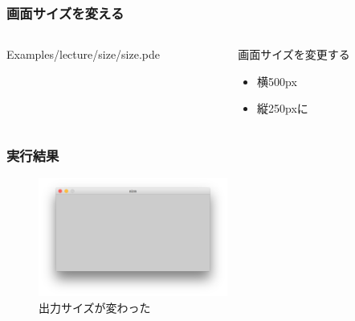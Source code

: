 \documentclass[10pt, dvipdfmx]{beamer}
\begin{document}
        \begin{frame}
            \frametitle{画面サイズを変える}
            \begin{columns}[c]
                \begin{column}{0.50\textwidth}
                    \tiny
                    Examples/lecture/size/size.pde
                    \scriptsize
                \end{column}
                \begin{column}{0.50\textwidth}
                    \begin{block}{画面サイズを変更する}
                        \begin{itemize}
                            \item 横500px
                            \item 縦250pxに
                        \end{itemize}
                    \end{block}
                \end{column}
            \end{columns}
        \end{frame}

        \begin{frame}
            \frametitle{実行結果}
                \begin{figure}[htb]
                    \includegraphics[width=62.1mm]{images/07.png}
                    \caption{出力サイズが変わった}
                    \label{fig:07}
                \end{figure}
        \end{frame}
\end{document}
